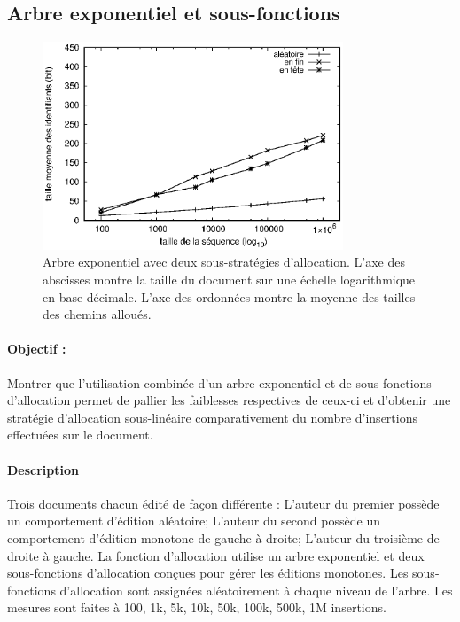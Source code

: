 \subsection{Arbre exponentiel et sous-fonctions}

\begin{figure}
  \begin{center}
    \includegraphics[width=0.8\textwidth]{img/lseq/lseq.eps}
    \caption{\label{repl:img:lseq} Arbre exponentiel avec deux sous-stratégies
      d'allocation. L'axe des abscisses montre la taille du document sur une
      échelle logarithmique en base décimale. L'axe des ordonnées montre la
      moyenne des tailles des chemins alloués.}
  \end{center}
\end{figure}

\paragraph{Objectif :} Montrer que l'utilisation combinée d'un arbre exponentiel
et de sous-fonctions d'allocation permet de pallier les faiblesses respectives
de ceux-ci et d'obtenir une stratégie d'allocation sous-linéaire comparativement
du nombre d'insertions effectuées sur le document. 

\paragraph{Description} Trois documents chacun édité de façon différente :
L'auteur du premier possède un comportement d'édition aléatoire; L'auteur du
second possède un comportement d'édition monotone de gauche à droite; L'auteur
du troisième de droite à gauche. La fonction d'allocation utilise un arbre
exponentiel et deux sous-fonctions d'allocation conçues pour gérer les éditions
monotones. Les sous-fonctions d'allocation sont assignées aléatoirement à chaque
niveau de l'arbre. Les mesures sont faites à 100, 1k, 5k, 10k, 50k, 100k, 500k,
1M insertions.

